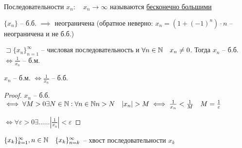     \begin{definition}
        Последовательности $x_n:\quad x_n\to \infty $ называются \underline{бесконечно большими}
    \end{definition}
    \begin{note}
        $\{x_n\}$ -- б.б. $\implies $ неограничена (обратное неверно: $x_{n}  = (1+(-1)^n)\cdot n$ -- неограничена и не б.б.)
    \end{note}
    \begin{lemma}

        $\sqsupset  \{x_n\}_{n=1}^{\infty }$ -- числовая последовательность и $\forall n\in \mathbb{N}  \quad x_n\neq 0$. Тогда $x_{n} $ -- б.б. $\iff \frac{1}{x_{n} }$ -- б.м. 

        $x_{n} $ -- б.м. $\iff  \frac{1}{x_{n} }$ -- б.б.
    \end{lemma}
    \begin{proof}
        $x_{n} $ -- б.б. $\iff  \forall M>0 \exists  N\in \mathbb{N} : \forall n\in \mathbb{N}  n>N\quad |x_n| >M \iff \frac{1}{x_{n} }<\frac{1}{M}\quad M = \frac{1}{\varepsilon}$

        $\iff \forall \varepsilon >0 \exists \ldots\ldots \left| \frac{1}{x_{n} } \right| <\varepsilon$
    \end{proof}

    $\{x_k\}_{k=1}^{\infty }, n\in \mathbb{N} \quad \{x_k\}_{n=k}^{\infty }$ -- хвост последовательности $x_k$

